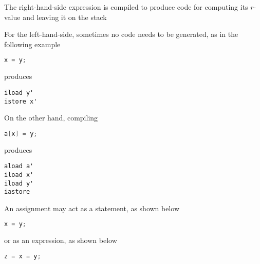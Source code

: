 \documentclass[8pt,a4paper,compress]{beamer}
\begin{document}
\begin{frame}[fragile]
\pause

The right-hand-side expression is compiled to produce code for computing its $r$-value and leaving it on the stack

\pause
\bigskip

For the left-hand-side, sometimes no code needs to be generated, as in the following example
\begin{lstlisting}[language=Java]
x = y;
\end{lstlisting}
produces
\begin{lstlisting}[language={}]
iload y'
istore x'
\end{lstlisting}

\pause
\bigskip

On the other hand, compiling
\begin{lstlisting}[language=Java]
a[x] = y;
\end{lstlisting}
produces
\begin{lstlisting}[language={}]
aload a'
iload x'
iload y'
iastore
\end{lstlisting}

\pause
\bigskip

An assignment may act as a statement, as shown below
\begin{lstlisting}[language=Java]
x = y;
\end{lstlisting}
or as an expression, as shown below
\begin{lstlisting}[language=Java]
z = x = y;
\end{lstlisting}
\end{frame}
\end{document}
